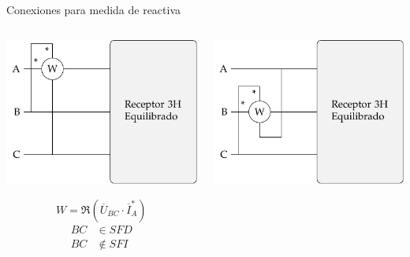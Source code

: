 \documentclass[xcolor={usenames,svgnames,dvipsnames}]{beamer}
\begin{document}
\begin{frame}[label={sec:orgb3d48ad}]{Conexiones para medida de reactiva}
\begin{columns}
\begin{column}{0.33\columnwidth}
\begin{center}
\includegraphics[width=.9\linewidth]{figs/Reactiva3H_A-BC.pdf}
\end{center}
\[
  W = \Re(\overline{U}_{BC} \cdot \overline{I}_A^*)
\]
\begin{align*}
  BC &\in SFD\\
  BC &\notin SFI
\end{align*}
\end{column}
\begin{column}{0.33\columnwidth}
\begin{center}
\includegraphics[width=.9\linewidth]{figs/Reactiva3H_B-CA.pdf}

\end{center}
\end{column}
\end{columns}
\end{frame}
\end{document}
